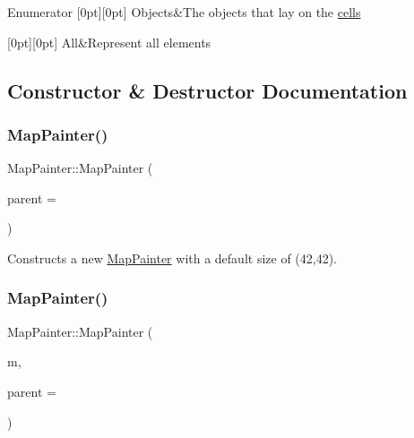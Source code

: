 \begin{DoxyEnumFields}{Enumerator}
[0pt][0pt]{}\hypertarget{class_map_painter_a771b3fa246b6c13cc2acbdcf1cb6eee3a11b1008cd0aafe904943c1a11cb50ad6}{}\label{class_map_painter_a771b3fa246b6c13cc2acbdcf1cb6eee3a11b1008cd0aafe904943c1a11cb50ad6} 
Objects&The objects that lay on the \hyperlink{class_cell}{cells} \\
\hline

[0pt][0pt]{}\hypertarget{class_map_painter_a771b3fa246b6c13cc2acbdcf1cb6eee3a25561a3666e5fd539263be7c6e9ab063}{}\label{class_map_painter_a771b3fa246b6c13cc2acbdcf1cb6eee3a25561a3666e5fd539263be7c6e9ab063} 
All&Represent all elements \\
\hline

\end{DoxyEnumFields}


\subsection{Constructor \& Destructor Documentation}
\hypertarget{class_map_painter_a9c1c9ee90336daa528e090334ef67a39}{}\label{class_map_painter_a9c1c9ee90336daa528e090334ef67a39} 
\subsubsection{\texorpdfstring{Map\+Painter()}{MapPainter()}\hspace{0.1cm}{\footnotesize\ttfamily [1/2]}}
{\footnotesize\ttfamily Map\+Painter\+::\+Map\+Painter (\begin{DoxyParamCaption}\item[{Q\+Object $\ast$}]{parent = {} }\end{DoxyParamCaption})}

Constructs a new \hyperlink{class_map_painter}{Map\+Painter} with a default size of (42,42). \hypertarget{class_map_painter_a6d282b26150b3d5b592f307f09b29e4c}{}\label{class_map_painter_a6d282b26150b3d5b592f307f09b29e4c} 
\subsubsection{\texorpdfstring{Map\+Painter()}{MapPainter()}\hspace{0.1cm}{\footnotesize\ttfamily [2/2]}}
{\footnotesize\ttfamily Map\+Painter\+::\+Map\+Painter (\begin{DoxyParamCaption}\item[{\hyperlink{class_map}{Map} $\ast$}]{m,  }\item[{Q\+Object $\ast$}]{parent = {} }\end{DoxyParamCaption})}


